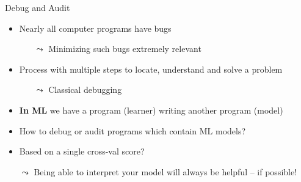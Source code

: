 \documentclass[10pt,compress,t,notes=noshow, xcolor=table]{beamer}
\begin{document}
\begin{frame}{Debug and Audit}
    \begin{itemize}
        \item Nearly all computer programs have bugs
        \begin{itemize}
            \item[$\leadsto$] Minimizing such bugs extremely relevant
        \end{itemize}
        \item Process with multiple steps to locate, understand and solve a problem
        \begin{itemize}
            \item[$\leadsto$] Classical debugging
        \end{itemize}
        \item \textbf{In ML} we have a program (learner) writing another program (model)
        \item How to debug or audit programs which contain ML models? 
        \item Based on a single cross-val score?
            \item[$\leadsto$] Being able to interpret your model will always be helpful -- if possible!
    \end{itemize}
\end{frame}



\end{document}
